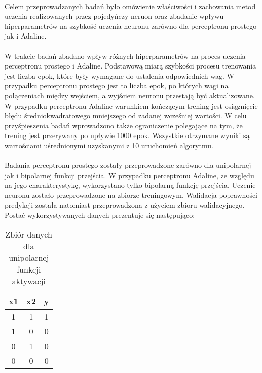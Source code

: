 \documentclass[../main.tex]{subfiles}
\begin{document}
    \paragraph{}
    Celem przeprowadzanych badań było omówienie właściwości i zachowania metod uczenia realizowanych przez pojedyńczy neruon oraz zbadanie wpływu hiperparametrów na szybkość uczenia neuronu zarówno dla perceptronu prostego jak i Adaline.
    
    \paragraph{}
    W trakcie badań zbadano wpływ różnych hiperparametrów na proces uczenia perceptronu prostego i Adaline. Podstawową miarą szybkości procesu trenowania jest liczba epok, które były wymagane do ustalenia odpowiednich wag.
    W przypadku perceptronu prostego jest to liczba epok, po których wagi na połączeniach między wejściem, a wyjściem neuronu przestają być aktualizowane. W przypadku perceptronu Adaline warunkiem kończącym trening jest osiągnięcie błędu średniokwadratowego mniejszego od zadanej wcześniej wartości. W celu przyśpieszenia badań wprowadzono także ograniczenie polegające na tym, że trening jest przerywany po upływie 1000 epok. Wszystkie otrzymane wyniki są wartościami uśrednionymi uzyskanymi z 10 uruchomień algorytmu.
    
    \paragraph{}
    Badania perceptronu prostego zostały przeprowadzone zarówno dla unipolarnej jak i bipolarnej funkcji przejścia. W przypadku perceptronu Adaline, ze względu na jego charakterystykę, wykorzystano tylko bipolarną funkcję przejścia. Uczenie neuronu zostało przeprowadzone na zbiorze treningowym. Walidacja poprawności predykcji została natomiast przeprowadzona z użyciem zbioru walidacyjnego. Postać wykorzystywanych danych prezentuje się następująco:
    
    \begin{table}[h]
    \centering
    \begin{tabular}{|| c | c | c ||}
    \hline
    x1 & x2 & y \\ \hline
    1  & 1  & 1 \\
    1  & 0  & 0 \\
    0  & 1  & 0 \\
    0  & 0  & 0 \\ \hline
    \end{tabular}
    \caption{Zbiór danych dla unipolarnej funkcji aktywacji}
    \label{dataset_unipolar:1}
    \end{table}
    
\end{document}
